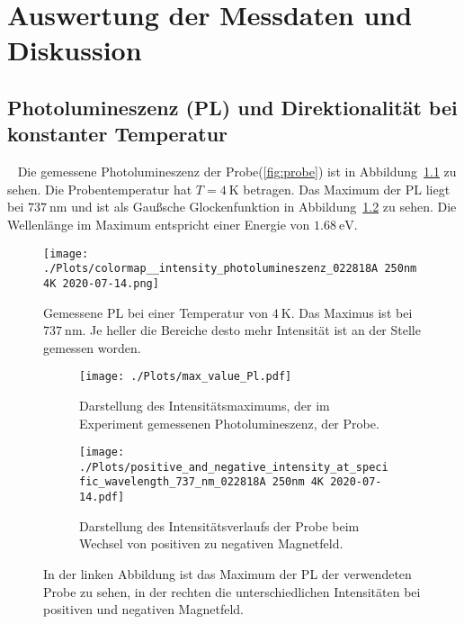 \chapter{Auswertung der Messdaten und Diskussion}

\section{Photolumineszenz (PL) und Direktionalität bei konstanter Temperatur}~\label{sec:PL_u_Direktionalitaet}
Die gemessene Photolumineszenz der Probe(\ref{fig:probe})
ist in Abbildung~\ref{fig:photo} zu sehen. Die Probentemperatur hat $T = \SI{4}{\kelvin}$ betragen.
Das Maximum der PL liegt bei $\SI{737}{\nano\meter}$ und ist als Gaußsche Glockenfunktion in Abbildung~\ref{fig:max}
zu sehen.
Die Wellenlänge im Maximum entspricht einer Energie von $\SI{1,68}{\eV}$.
\begin{figure}
    \centering
    \texttt{[image: ./Plots/colormap\_\_intensity\_photolumineszenz\_022818A 250nm 4K 2020-07-14.png]}
    \caption{Gemessene PL bei einer Temperatur von $\SI{4}{\kelvin}$. 
    Das Maximus ist bei $\SI{737}{\nano\meter}$. 
    Je heller die Bereiche desto mehr Intensität ist an der Stelle gemessen worden.}
    \label{fig:photo}
\end{figure}
\FloatBarrier
\begin{figure}
    \begin{subfigure}{0.5\textwidth}
        \texttt{[image: ./Plots/max\_value\_Pl.pdf]}
        \caption{Darstellung des Intensitätsmaximums, der im Experiment gemessenen Photolumineszenz, der Probe.}
        \label{fig:max}
    \end{subfigure}
    \begin{subfigure}{0.5\textwidth}
        \texttt{[image: ./Plots/positive\_and\_negative\_intensity\_at\_specific\_wavelength\_737\_nm\_022818A 250nm 4K 2020-07-14.pdf]}
        \caption{Darstellung des Intensitätsverlaufs der Probe beim Wechsel von positiven zu negativen Magnetfeld.}
        \label{fig:i_pn}
    \end{subfigure}
    \caption{In der linken Abbildung ist das Maximum der PL der verwendeten Probe zu sehen,
                in der rechten die unterschiedlichen Intensitäten bei positiven und negativen Magnetfeld. }
    \label{fig:rho}
\end{figure}
\FloatBarrier


